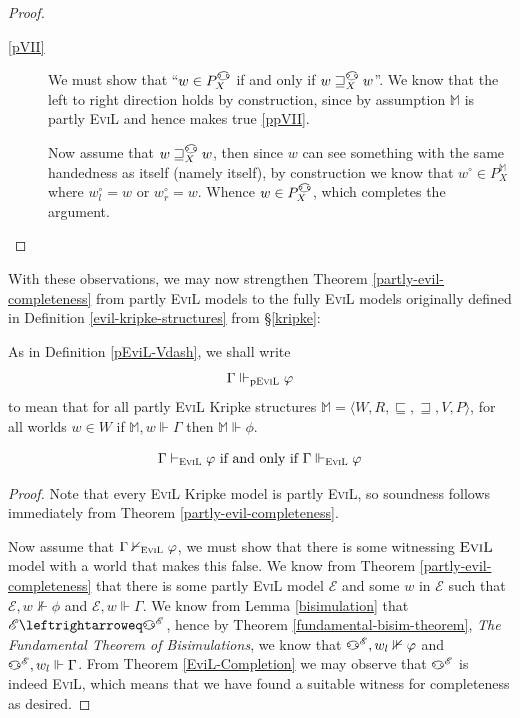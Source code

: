 \begin{proof}
\begin{description}
\item[\ref{pVII}]  We must show that ``$w \in P_X^\invis$ if
  and only if $w \sqsupseteq^\invis_X w$''. We know that the
  left to right direction holds by construction, since by assumption
  $\mathbb{M}$ is partly \textsc{EviL} and hence makes true
  \ref{ppVII}.

  Now assume that  $w \sqsupseteq^\invis_X w$, then since $w$ can see
  something with the same handedness as itself (namely itself), 
by construction we know that $w^\circ \in P_X^\mathbb{M}$ where $w^\circ_l = w$ or
$w^\circ_r=w$.  Whence $w \in P^\invis_X$, which completes the argument.
\end{description}
\end{proof}

With these observations, we may now strengthen Theorem
\ref{partly-evil-completeness} from partly \textsc{EviL} models to
the fully \textsc{EviL} models originally defined in
Definition \ref{evil-kripke-structures} from \S\ref{kripke}:

\begin{definition}\label{EviL-Vdash}
As in Definition \ref{pEviL-Vdash}, we shall write
\[ \Gamma \Vdash_{\textup{p\textsc{EviL}}} \phi \]
to mean that for all partly \textsc{EviL} Kripke structures
$\mathbb{M} = \langle W, R, \sqsubseteq, \sqsupseteq, V, P \rangle$,
for all worlds $w \in W$ if $\mathbb{M},w \Vdash \Gamma$ then $\mathbb{M} \Vdash \phi$.
\end{definition}

\begin{theorem}\label{evil-completeness}
$$\Gamma \vdash_{\textsc{EviL}} \phi\textup{ if and only if }\Gamma
\Vdash_{\textup{\textsc{EviL}}} \phi$$
\end{theorem}
\begin{proof}
Note that every \textsc{EviL} Kripke model is partly
\textsc{EviL}, so soundness follows immediately from Theorem
\ref{partly-evil-completeness}.

Now assume that $\Gamma \nvdash_{\textsc{EviL}} \phi$, we must show
that there is some witnessing $\textsc{EviL}$ model with a world that
makes this false.   We know from Theorem
\ref{partly-evil-completeness} that there is 
some partly \textsc{EviL} model $\mathscr{E}$ and some
$w$ in $\mathscr{E}$ such that $\mathscr{E},w \nVdash \phi$ and $\mathscr{E},w \Vdash \Gamma$.  We
know from Lemma \ref{bisimulation} that $\mathscr{E} \leftrightarroweq
\invis^\mathscr{E}$, hence by Theorem \ref{fundamental-bisim-theorem},
\emph{The Fundamental Theorem of Bisimulations}, we know that
$\invis^\mathscr{E},w_l \nVdash \phi$ and 
$\invis^\mathscr{E},w_l \Vdash \Gamma$.  
From Theorem \ref{EviL-Completion} 
we may observe that  $\invis^\mathscr{E}$ is
indeed \textsc{EviL}, which means that we have found a suitable
witness for completeness as desired.
\end{proof}

